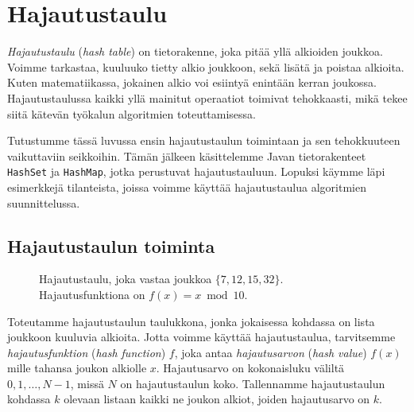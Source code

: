 \chapter{Hajautustaulu}


\emph{Hajautustaulu} (\emph{hash table}) on tietorakenne,
joka pitää yllä alkioiden joukkoa.
Voimme tarkastaa,
kuuluuko tietty alkio joukkoon,
sekä lisätä ja poistaa alkioita.
Kuten matematiikassa, jokainen alkio
voi esiintyä enintään kerran joukossa.
Hajautustaulussa kaikki yllä mainitut
operaatiot toimivat tehokkaasti, mikä tekee siitä
kätevän työkalun algoritmien toteuttamisessa.

Tutustumme tässä luvussa ensin hajautustaulun
toimintaan ja sen tehokkuuteen
vaikuttaviin seikkoihin.
Tämän jälkeen käsittelemme Javan tietorakenteet
\texttt{HashSet} ja \texttt{HashMap},
jotka perustuvat hajautustauluun.
Lopuksi käymme läpi esimerkkejä tilanteista,
joissa voimme käyttää hajautustaulua
algoritmien suunnittelussa.

\section{Hajautustaulun toiminta}

\begin{figure}
\center
{}
\caption{Hajautustaulu, joka vastaa joukkoa $\{7,12,15,32\}$.
Hajautusfunktiona on $f(x)=x \bmod 10$.}
\label{fig:hajtau}
\end{figure}


Toteutamme hajautustaulun taulukkona,
jonka jokaisessa kohdassa on lista joukkoon kuuluvia alkioita.
Jotta voimme käyttää hajautustaulua,
tarvitsemme \emph{hajautusfunktion} (\emph{hash function}) $f$,
joka antaa \emph{hajautusarvon} (\emph{hash value})
$f(x)$ mille tahansa joukon alkiolle $x$.
Hajautusarvo on kokonaisluku väliltä
$0,1,\dots,N-1$, missä $N$ on hajautustaulun koko.
Tallennamme hajautustaulun kohdassa $k$ olevaan listaan
kaikki ne joukon alkiot, joiden hajautusarvo on $k$.

